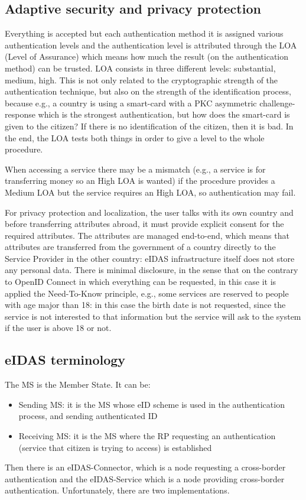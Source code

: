 \subsection{Adaptive security and privacy protection}
Everything is accepted but each authentication method it is assigned
various authentication levels and the authentication level is
attributed through the LOA (Level of Assurance) which means how much
the result (on the authentication method) can be trusted. LOA consists
in three different levels: substantial, medium, high. This is not only
related to the cryptographic strength of the authentication technique,
but also on the strength of the identification process, because e.g.,
a country is using a smart-card with a PKC asymmetric
challenge-response which is the strongest authentication, but how does
the smart-card is given to the citizen? If there is no identification
of the citizen, then it is bad. In the end, the LOA tests both things
in order to give a level to the whole procedure.

When accessing a service there may be a mismatch (e.g., a service is
for transferring money so an High LOA is wanted) if the procedure
provides a Medium LOA but the service requires an High LOA, so
authentication may fail.

For privacy protection and localization, the user talks with its own
country and before transferring attributes abroad, it must provide
explicit consent for the required attributes. The attributes are
managed end-to-end, which means that attributes are transferred from
the government of a country directly to the Service Provider in the
other country: eIDAS infrastructure itself does not store any personal
data. There is minimal disclosure, in the sense that on the contrary
to OpenID Connect in which everything can be requested, in this case
it is applied the Need-To-Know principle, e.g., some services are
reserved to people with age major than 18: in this case the birth date
is not requested, since the service is not interested to that
information but the service will ask to the system if the user is
above 18 or not.

\subsection{eIDAS terminology}
The MS is the Member State. It can be:
\begin{itemize}
  \item Sending MS: it is the MS whose eID scheme is used in the
    authentication process, and sending authenticated ID
  \item Receiving MS: it is the MS where the RP requesting an
    authentication (service that citizen is trying to access) is
    established
\end{itemize}
Then there is an eIDAS-Connector, which is a node requesting a
cross-border authentication and the eIDAS-Service which is a node
providing cross-border authentication. Unfortunately, there are two
implementations.


